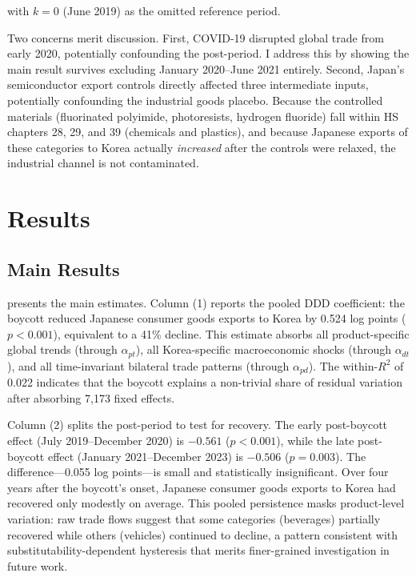 \documentclass[12pt]{article}
\begin{document}
\noindent with $k = 0$ (June 2019) as the omitted reference period.

Two concerns merit discussion. First, COVID-19 disrupted global trade from early 2020, potentially confounding the post-period. I address this by showing the main result survives excluding January 2020--June 2021 entirely. Second, Japan's semiconductor export controls directly affected three intermediate inputs, potentially confounding the industrial goods placebo. Because the controlled materials (fluorinated polyimide, photoresists, hydrogen fluoride) fall within HS chapters 28, 29, and 39 (chemicals and plastics), and because Japanese exports of these categories to Korea actually \textit{increased} after the controls were relaxed, the industrial channel is not contaminated.


\section{Results}

\subsection{Main Results}

 presents the main estimates. Column (1) reports the pooled DDD coefficient: the boycott reduced Japanese consumer goods exports to Korea by 0.524 log points ($p < 0.001$), equivalent to a 41\% decline. This estimate absorbs all product-specific global trends (through $\alpha_{pt}$), all Korea-specific macroeconomic shocks (through $\alpha_{dt}$), and all time-invariant bilateral trade patterns (through $\alpha_{pd}$). The within-$R^2$ of 0.022 indicates that the boycott explains a non-trivial share of residual variation after absorbing 7,173 fixed effects.

Column (2) splits the post-period to test for recovery. The early post-boycott effect (July 2019--December 2020) is $-0.561$ ($p < 0.001$), while the late post-boycott effect (January 2021--December 2023) is $-0.506$ ($p = 0.003$). The difference---0.055 log points---is small and statistically insignificant. Over four years after the boycott's onset, Japanese consumer goods exports to Korea had recovered only modestly on average. This pooled persistence masks product-level variation: raw trade flows suggest that some categories (beverages) partially recovered while others (vehicles) continued to decline, a pattern consistent with substitutability-dependent hysteresis that merits finer-grained investigation in future work.
\end{document}
